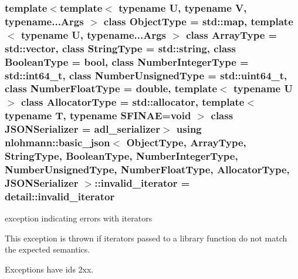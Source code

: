 \subsubsection[{\texorpdfstring{invalid\+\_\+iterator}{invalid_iterator}}]{\setlength{\rightskip}{0pt plus 5cm}template$<$template$<$ typename U, typename V, typename...\+Args $>$ class Object\+Type = std\+::map, template$<$ typename U, typename...\+Args $>$ class Array\+Type = std\+::vector, class String\+Type  = std\+::string, class Boolean\+Type  = bool, class Number\+Integer\+Type  = std\+::int64\+\_\+t, class Number\+Unsigned\+Type  = std\+::uint64\+\_\+t, class Number\+Float\+Type  = double, template$<$ typename U $>$ class Allocator\+Type = std\+::allocator, template$<$ typename T, typename S\+F\+I\+N\+A\+E=void $>$ class J\+S\+O\+N\+Serializer = adl\+\_\+serializer$>$ using {\bf nlohmann\+::basic\+\_\+json}$<$ Object\+Type, Array\+Type, String\+Type, Boolean\+Type, Number\+Integer\+Type, Number\+Unsigned\+Type, Number\+Float\+Type, Allocator\+Type, J\+S\+O\+N\+Serializer $>$\+::{\bf invalid\+\_\+iterator} =  {\bf detail\+::invalid\+\_\+iterator}}\hypertarget{classnlohmann_1_1basic__json_ac13d32f7cbd02d616e71d8dc30dadcbf}{}\label{classnlohmann_1_1basic__json_ac13d32f7cbd02d616e71d8dc30dadcbf}


exception indicating errors with iterators 

This exception is thrown if iterators passed to a library function do not match the expected semantics.

Exceptions have ids 2xx.

